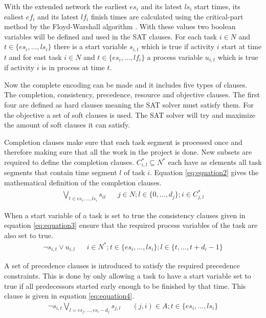 With the extended network the earliest \(es_i\) and its latest \(ls_i\) start times, its ealiest \(ef_i\) and its latest \(lf_i\) finish times are calculated using the critical-part method by the Floyd-Warshall algorithm \cite{RN53}. With these values two boolean variables will be defined and used in the SAT clauses. For each task \(i \in N\) and \(t \in \{es_i,...,ls_i\}\) there is a start variable \(s_{i,t}\) which is true if activity \(i\) start at time \(t\) and for east task \(i \in N\) and \(t \in \{es_i,...,lf_i\}\) a process variable \(u_{i,t}\) which is true if activity \(i\) is in process at time \(t\).

Now the complete encoding can be made and it includes five types of clauses. The completion, consistency, precedence, resource and objective clauses. The first four are defined as hard clauses meaning the SAT solver must satisfy them. For the objective a set of soft clauses is used. The SAT solver will try and maximize the amount of soft clauses it can satisfy.

Completion clauses make sure that each task segment is processed once and therefore making sure that all the work in the project is done. New subsets are required to define the completion clauses. \(C^*_{i,l} \subseteq N^*\) each have as elements all task segments that contain time segment \(l\) of task \(i\). Equation \ref{eq:equation2} gives the mathematical definition of the completion clauses.
\begin{align}\label{eq:equation2}
\bigvee_{t\in {es_i,...,ls_i}} s_{it}   &&  j\in N; l\in \{0,...,d_j\}; i\in C^*_{j,l}
\end{align}

When a start variable of a task is set to true the consistency clauses given in equation \ref{eq:equation3} ensure that the required process variables of the task are also set to true.
\begin{align}\label{eq:equation3}
\neg s_{i,t} \vee u_{i,l}   &&  i\in N^*;t\in \{es_i,...,ls_i\};l\in \{t,...,t+d_i-1\}
\end{align}

A set of precedence clauses is introduced to satisfy the required precedence constraints. This is done by only allowing a task to have a start variable set to true if all predecessors started early enough to be finished by that time. This clause is given in equation \ref{eq:equation4}.
\begin{align}\label{eq:equation4}
\neg s_{i,t} \bigvee_{l=es_j,...,es_i-d_j} s_{j,l}  &&  (j,i)\in A; t\in\{es_i,...,ls_i\}
\end{align}

